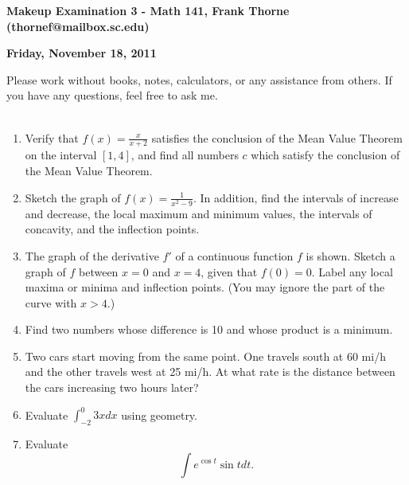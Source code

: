 \documentclass[11pt]{article}
\begin{document}
\setlength{\topmargin}{-2mm}





\begin{center}{\bf Makeup Examination 3 - Math 141, Frank Thorne (thornef@mailbox.sc.edu)}
\end{center}
\begin{center}
{\bf Friday, November 18, 2011}
\end{center}

Please work without books, notes, calculators, or any assistance from others. If you have
any questions, feel free to ask me. 
\\
\\
\begin{enumerate}[(1)]
\item
Verify that $f(x) = \frac{x}{x + 2}$ satisfies the conclusion of the Mean Value Theorem
on the interval $[1, 4]$, and find all numbers $c$ which satisfy the conclusion of the Mean
Value Theorem.

\item
Sketch the graph of $f(x) = \frac{1}{x^2 - 9}$. In addition, find the intervals of increase
and decrease, the local maximum and minimum values, the intervals of concavity, and the
inflection points.

\item
The graph of the derivative $f'$ of a continuous function $f$ is shown. Sketch a graph of
$f$ between $x = 0$ and $x = 4$, given that $f(0) = 0$. Label any local maxima or minima
and inflection points. (You may ignore the part of the curve with $x > 4$.)

\item
Find two numbers whose difference is 10 and whose product is a minimum.

\item
Two cars start moving from the same point. One travels south at 60 mi/h and the other
travels west at 25 mi/h. At what rate is the distance between the cars increasing two
hours later?

\item
Evaluate
$\int_{-2}^0 3x dx$ using geometry.

\item
Evaluate
$$\int e^{\cos t} \sin t dt.$$

\end{enumerate}
\end{document}
